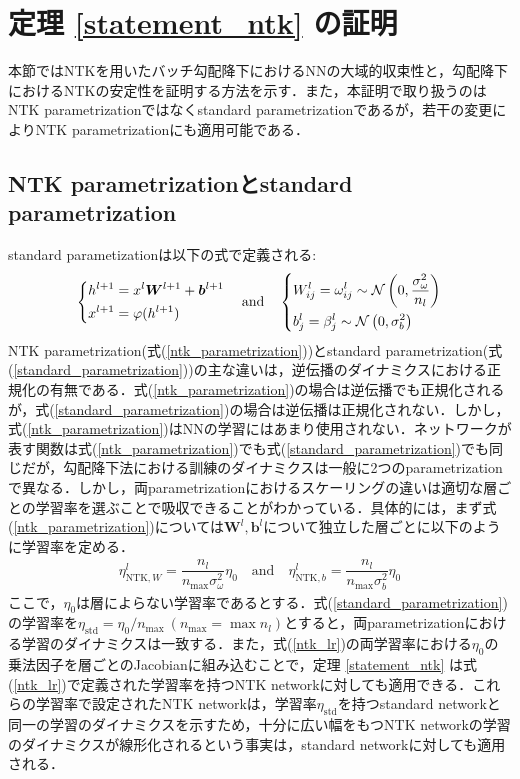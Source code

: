 \def\thesection{\Alph{section}}
\section{定理 \ref{statement_ntk} の証明}
\label{appendix_01}
本節ではNTKを用いたバッチ勾配降下におけるNNの大域的収束性と，勾配降下におけるNTKの安定性を証明する方法を示す．また，本証明で取り扱うのはNTK parametrizationではなくstandard parametrizationであるが，若干の変更によりNTK parametrizationにも適用可能である．

\subsection{NTK parametrizationとstandard parametrization}
standard parametizationは以下の式で定義される:
\begin{align}
    \label{standard_parametrization}
        \begin{dcases}
            h^{l+1} = x^{l}\bm{W}^{l+1} + \bm{b}^{l+1} \\
            x^{l+1} = \varphi(h^{l+1})
        \end{dcases}
        \quad\mbox{and}\quad
        \begin{dcases}
            W_{ij}^{l} = \omega_{ij}^{l} \sim \mathcal{N}\left(0, \dfrac{\sigma_{\omega}^2}{n_l}\right) \\
            b_{j}^{l} = \beta_{j}^{l} \sim \mathcal{N}\left(0, \sigma_b^2\right)
        \end{dcases}
    \end{align}
NTK parametrization(式(\ref{ntk_parametrization}))とstandard parametrization(式(\ref{standard_parametrization}))の主な違いは，逆伝播のダイナミクスにおける正規化の有無である．式(\ref{ntk_parametrization})の場合は逆伝播でも正規化されるが，式(\ref{standard_parametrization})の場合は逆伝播は正規化されない．しかし，式(\ref{ntk_parametrization})はNNの学習にはあまり使用されない．ネットワークが表す関数は式(\ref{ntk_parametrization})でも式(\ref{standard_parametrization})でも同じだが，勾配降下法における訓練のダイナミクスは一般に2つのparametrizationで異なる．しかし，両parametrizationにおけるスケーリングの違いは適切な層ごとの学習率を選ぶことで吸収できることがわかっている．具体的には，まず式(\ref{ntk_parametrization})については$\bm{W}^l, \bm{b}^l$について独立した層ごとに以下のように学習率を定める．
\begin{align}
    \label{ntk_lr}
    \eta_{\mathrm{NTK}, W}^l = \dfrac{n_l}{n_{\max}\sigma_{\omega}^2}\eta_0 \quad\mbox{and}\quad \eta_{\mathrm{NTK}, b}^l = \dfrac{n_l}{n_{\max}\sigma_{b}^2}\eta_0
\end{align}
ここで，$\eta_0$は層によらない学習率であるとする．式(\ref{standard_parametrization})の学習率を$\eta_{\mathrm{std}} = \eta_0 / n_{\max} \ (n_{\max} = \max n_l)$とすると，両parametrizationにおける学習のダイナミクスは一致する．また，式(\ref{ntk_lr})の両学習率における$\eta_0$の乗法因子を層ごとのJacobianに組み込むことで，定理 \ref{statement_ntk} は式(\ref{ntk_lr})で定義された学習率を持つNTK networkに対しても適用できる．これらの学習率で設定されたNTK networkは，学習率$\eta_{\mathrm{std}}$を持つstandard networkと同一の学習のダイナミクスを示すため，十分に広い幅をもつNTK networkの学習のダイナミクスが線形化されるという事実は，standard networkに対しても適用される．

